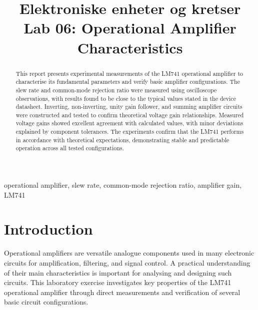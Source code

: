 \documentclass[conference]{IEEEtran}
\begin{document}
\title{Elektroniske enheter og kretser\\
Lab 06: Operational Amplifier Characteristics}

\author{
}

\maketitle


\begin{abstract}
This report presents experimental measurements of the LM741 operational amplifier to characterise its fundamental parameters and verify basic amplifier configurations.  
The slew rate and common-mode rejection ratio were measured using oscilloscope observations, with results found to be close to the typical values stated in the device datasheet.  
Inverting, non-inverting, unity gain follower, and summing amplifier circuits were constructed and tested to confirm theoretical voltage gain relationships.  
Measured voltage gains showed excellent agreement with calculated values, with minor deviations explained by component tolerances.  
The experiments confirm that the LM741 performs in accordance with theoretical expectations, demonstrating stable and predictable operation across all tested configurations.  
\end{abstract}

\begin{IEEEkeywords}
operational amplifier, slew rate, common-mode rejection ratio, amplifier gain, LM741
\end{IEEEkeywords}

\section{Introduction}

Operational amplifiers are versatile analogue components used in many electronic circuits for amplification, filtering, and signal control.  
A practical understanding of their main characteristics is important for analysing and designing such circuits.  
This laboratory exercise investigates key properties of the LM741 operational amplifier through direct measurements and verification of several basic circuit configurations.  
\end{document}

